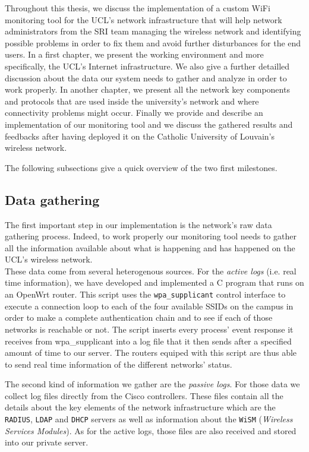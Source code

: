 Throughout this thesis, we discuss the implementation of a custom WiFi monitoring tool for the UCL's network infrastructure that will help network administrators from the SRI team managing the wireless network and identifying possible problems in order to fix them and avoid further disturbances for the end users. In a first chapter, we present the working environment and more specifically, the UCL's Internet infrastructure. We also give a further detailled discussion about the data our system needs to gather and analyze in order to work properly. In another chapter, we present all the network key components and protocols that are used inside the university's network and where connectivity problems might occur. Finally we provide and describe an implementation of our monitoring tool and we discuss the gathered results and feedbacks after having deployed it on the Catholic University of Louvain's wireless network.

The following subsections give a quick overview of the two first milestones.


\subsection{Data gathering}
The first important step in our implementation is the network's raw data gathering process. Indeed, to work properly our monitoring tool needs to gather all the information available about what is happening and has happened on the UCL's wireless network.\\
These data come from several heterogenous sources. For the \textit{active logs} (i.e. real time information), we have developed and implemented a C program that runs on an OpenWrt router. This script uses the \texttt{wpa\_supplicant} control interface to execute a connection loop to each of the four available SSIDs on the campus in order to make a complete authentication chain and to see if each of those networks is reachable or not. The script inserts every process' event response it receives from wpa\_supplicant into a log file that it then sends after a specified amount of time to our server. The routers equiped with this script are thus able to send real time information of the different networks' status.

The second kind of information we gather are the \textit{passive logs}. For those data we collect log files directly from the Cisco controllers. These files contain all the details about the key elements of the network infrastructure which are the \texttt{RADIUS}, \texttt{LDAP} and \texttt{DHCP} servers as well as information about the \texttt{WiSM} (\textit{Wireless Services Modules}). As for the active logs, those files are also received and stored into our private server.



